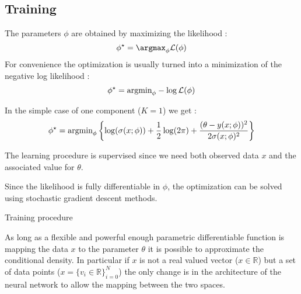 \subsection{Training}


The parameters $\phi$ are obtained by maximizing the likelihood :
\begin{equation}
    \phi^\star = \argmax_\phi \mathcal L (\phi)
\end{equation}
For convenience the optimization is usually turned into a minimization of the negative log likelihood :
\begin{equation}
    \phi^\star = {\text{argmin}}_\phi - \log \mathcal L (\phi)
\end{equation}

In the simple case of one component ($K=1$) we get :
\begin{equation}
    \phi^\star = {\text{argmin}}_\phi \left\{ \log(\sigma(x;\phi)) + \frac{1}{2}\log(2\pi) + \frac{(\theta - y(x;\phi))^2}{2\sigma(x;\phi)^2} \right\}
\end{equation}

The learning procedure is supervised since we need both observed data $x$ and the associated value for  $\theta$.

Since the likelihood is fully differentiable in $\phi$, the optimization can be solved using stochastic gradient descent methods.

\begin{algorithm}[H]
 \caption{Training procedure}
\end{algorithm}

As long as a flexible and powerful enough parametric differentiable function is mapping the data $x$ to the parameter $\theta$ it is possible to approximate the conditional density.
In particular if $x$ is not a real valued vector ($x \in \mathbb R$) but a set of data points ($x = \{v_i \in \mathbb R\}_{i=0}^N$) the only change is in the architecture of the neural network to allow the mapping between the two spaces.

